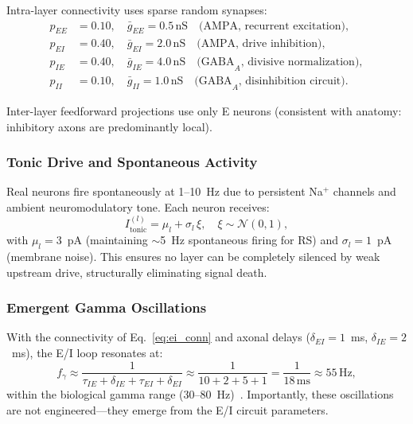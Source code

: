 \documentclass[11pt,a4paper]{article}
\begin{document}
Intra-layer connectivity uses sparse random synapses:
\begin{equation}\label{eq:ei_conn}
\begin{aligned}
  p_{EE} &= 0.10, \quad \bar{g}_{EE} = 0.5\,\mathrm{nS}
    \quad\text{(AMPA, recurrent excitation)}, \\
  p_{EI} &= 0.40, \quad \bar{g}_{EI} = 2.0\,\mathrm{nS}
    \quad\text{(AMPA, drive inhibition)}, \\
  p_{IE} &= 0.40, \quad \bar{g}_{IE} = 4.0\,\mathrm{nS}
    \quad\text{(GABA}_A\text{, divisive normalization)}, \\
  p_{II} &= 0.10, \quad \bar{g}_{II} = 1.0\,\mathrm{nS}
    \quad\text{(GABA}_A\text{, disinhibition circuit)}.
\end{aligned}
\end{equation}

Inter-layer feedforward projections use only E neurons
(consistent with anatomy: inhibitory axons are predominantly local).

\subsubsection{Tonic Drive and Spontaneous Activity}

Real neurons fire spontaneously at 1--10~Hz due to persistent Na$^+$
channels and ambient neuromodulatory tone.
Each neuron receives:
\begin{equation}\label{eq:tonic}
  I_\mathrm{tonic}^{(l)} = \mu_l + \sigma_l\,\xi,
  \quad \xi \sim \mathcal{N}(0,1),
\end{equation}
with $\mu_l = 3$~pA (maintaining $\sim$5~Hz spontaneous firing for RS)
and $\sigma_l = 1$~pA (membrane noise).
This ensures no layer can be completely silenced by weak upstream drive,
structurally eliminating signal death.

\subsubsection{Emergent Gamma Oscillations}

With the connectivity of Eq.~\ref{eq:ei_conn} and axonal delays
($\delta_{EI} = 1$~ms, $\delta_{IE} = 2$~ms), the E/I loop resonates at:
\begin{equation}\label{eq:gamma}
  f_\gamma \approx \frac{1}{\tau_{IE} + \delta_{IE} + \tau_{EI} + \delta_{EI}}
  \approx \frac{1}{10 + 2 + 5 + 1} = \frac{1}{18\,\mathrm{ms}}
  \approx 55\,\mathrm{Hz},
\end{equation}
within the biological gamma range (30--80~Hz)~\cite{wang1996}.
Importantly, these oscillations are not engineered---they emerge from
the E/I circuit parameters.
\end{document}
